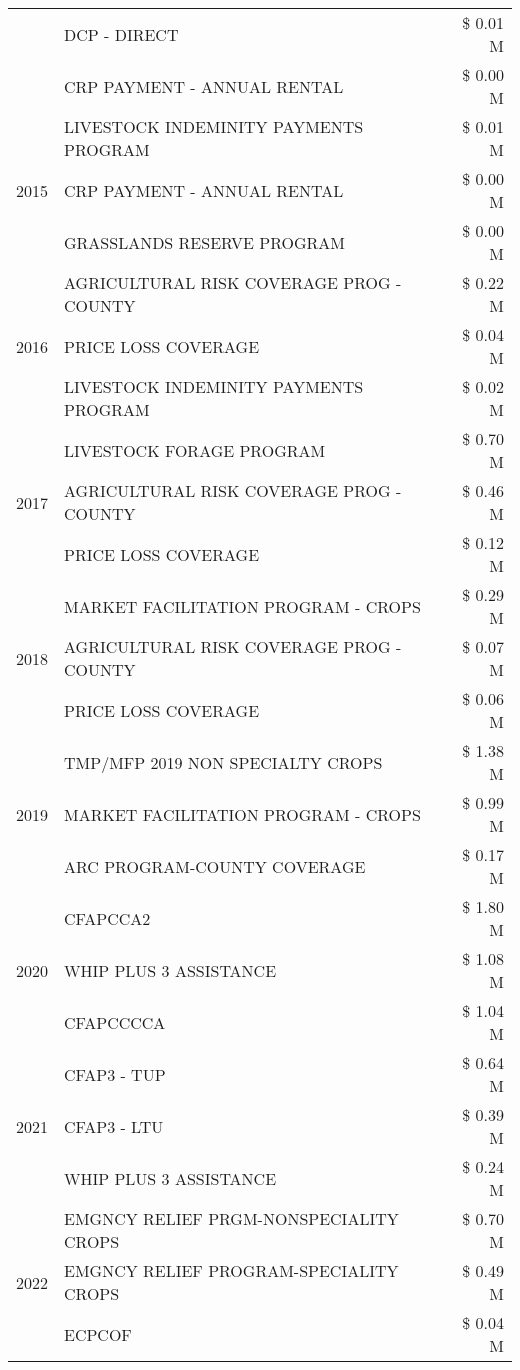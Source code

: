 \begin{tabular}{llr}
 & DCP - DIRECT & \$ 0.01 M \\
 & CRP PAYMENT - ANNUAL RENTAL & \$ 0.00 M \\
\cline{1-3}
\multirow[t]{3}{*}{2015} & LIVESTOCK INDEMINITY PAYMENTS PROGRAM & \$ 0.01 M \\
 & CRP PAYMENT - ANNUAL RENTAL & \$ 0.00 M \\
 & GRASSLANDS RESERVE PROGRAM & \$ 0.00 M \\
\cline{1-3}
\multirow[t]{3}{*}{2016} & AGRICULTURAL RISK COVERAGE PROG - COUNTY & \$ 0.22 M \\
 & PRICE LOSS COVERAGE & \$ 0.04 M \\
 & LIVESTOCK INDEMINITY PAYMENTS PROGRAM & \$ 0.02 M \\
\cline{1-3}
\multirow[t]{3}{*}{2017} & LIVESTOCK FORAGE PROGRAM & \$ 0.70 M \\
 & AGRICULTURAL RISK COVERAGE PROG - COUNTY & \$ 0.46 M \\
 & PRICE LOSS COVERAGE & \$ 0.12 M \\
\cline{1-3}
\multirow[t]{3}{*}{2018} & MARKET FACILITATION PROGRAM - CROPS & \$ 0.29 M \\
 & AGRICULTURAL RISK COVERAGE PROG - COUNTY & \$ 0.07 M \\
 & PRICE LOSS COVERAGE & \$ 0.06 M \\
\cline{1-3}
\multirow[t]{3}{*}{2019} & TMP/MFP 2019 NON SPECIALTY CROPS & \$ 1.38 M \\
 & MARKET FACILITATION PROGRAM - CROPS & \$ 0.99 M \\
 & ARC PROGRAM-COUNTY COVERAGE & \$ 0.17 M \\
\cline{1-3}
\multirow[t]{3}{*}{2020} & CFAPCCA2 & \$ 1.80 M \\
 & WHIP PLUS 3 ASSISTANCE & \$ 1.08 M \\
 & CFAPCCCCA & \$ 1.04 M \\
\cline{1-3}
\multirow[t]{3}{*}{2021} & CFAP3 - TUP & \$ 0.64 M \\
 & CFAP3 - LTU & \$ 0.39 M \\
 & WHIP PLUS 3 ASSISTANCE & \$ 0.24 M \\
\cline{1-3}
\multirow[t]{3}{*}{2022} & EMGNCY RELIEF PRGM-NONSPECIALITY CROPS & \$ 0.70 M \\
 & EMGNCY RELIEF PROGRAM-SPECIALITY CROPS & \$ 0.49 M \\
 & ECPCOF & \$ 0.04 M \\
\cline{1-3}
\bottomrule
\end{tabular}
